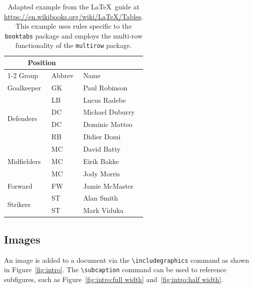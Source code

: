 \begin{table}[ht] %
  \centering
  \begin{tabular}{lll}
    \toprule
    \multicolumn{2}{c}{Position} \\
    \cmidrule{1-2} %
    Group & Abbrev & Name \\
    \midrule
    Goalkeeper & GK & Paul Robinson \\
    \midrule
    \multirow{4}{*}{Defenders} & LB & Lucus Radebe \\
                               & DC & Michael Duburry \\
                               & DC & Dominic Matteo \\
                               & RB & Didier Domi \\
    \midrule
    \multirow{3}{*}{Midfielders} & MC & David Batty \\
                                 & MC & Eirik Bakke \\
                                 & MC & Jody Morris \\
    \midrule
    Forward & FW & Jamie McMaster \\
    \midrule
    \multirow{2}{*}{Strikers} & ST & Alan Smith \\
                              & ST & Mark Viduka \\
    \bottomrule
  \end{tabular}
  \caption[\LaTeX\ table example with shortened caption for the list of tables]{Adapted example from the \LaTeX\ guide at \url{https://en.wikibooks.org/wiki/LaTeX/Tables}. This example uses rules specific to the \texttt{booktabs} package and employs the multi-row functionality of the \texttt{multirow} package.}
  \label{tab:intro} %
\end{table}

\subsection{Images}

An image is added to a document via the \verb|\includegraphics| command as shown in Figure~\ref{fig:intro}.
The \verb|\subcaption| command can be used to reference subfigures, such as Figure~\ref{fig:intro:full width} and~\ref{fig:intro:half width}.

